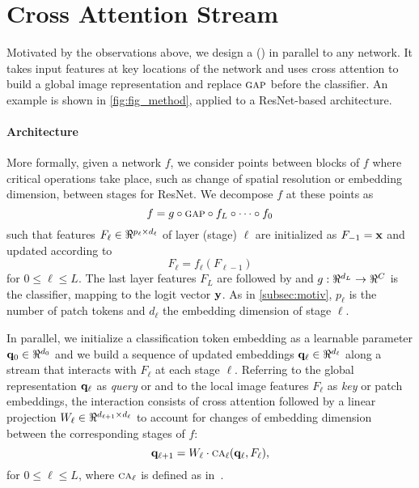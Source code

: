 \section{Cross Attention Stream}
\label{sec:ca_design}
Motivated by the observations above, we design a \emph{\OURS} (\emph{\Ours}) in parallel to any network. It takes input features at key locations of the network and uses cross attention to build a global image representation and replace ${\textsc{gap}}$ before the classifier. An example is shown in \autoref{fig:fig_method}, applied to a ResNet-based architecture.

\paragraph{Architecture}

More formally, given a network $f$, we consider points between blocks of $f$ where critical operations take place, such as change of spatial resolution or embedding dimension, \eg between stages for ResNet. We decompose $f$ at these points as
\begin{equation}
	f = g \circ {\textsc{gap}} \circ f_L \circ \dots \circ f_0
\label{eq:f-decomp}
\end{equation}
such that features $F_\ell \in \real^{p_\ell \times d_\ell}$ of layer (stage) $\ell$ are initialized as $F_{-1} = \mathbf{x}$ and updated according to
\begin{equation}
	F_\ell = f_\ell(F_{\ell-1})
\label{eq:f-layer}
\end{equation}
for $0 \le \ell \le L$. The last layer features $F_L$ are followed by \gap and $g: \real^{d_L} \to \real^C$ is the classifier, mapping to the logit vector $\mathbf{y}$. As in \autoref{subsec:motiv}, $p_\ell$ is the number of patch tokens and $d_\ell$ the embedding dimension of stage $\ell$.

In parallel, we initialize a classification token embedding as a learnable parameter $\vq_0 \in \real^{d_0}$ and we build a sequence of updated embeddings $\vq_\ell \in \real^{d_\ell}$ along a stream that interacts with $F_\ell$ at each stage $\ell$. Referring to the global representation $\mathbf{q}_\ell$ as \emph{query} or \cls and to the local image features $F_\ell$ as \emph{key} or patch embeddings, the interaction consists of cross attention followed by a linear projection $W_\ell \in \real^{d_{\ell+1} \times d_\ell}$ to account for changes of embedding dimension between the corresponding stages of $f$:
\begin{equation}
	\mathbf{q}_{\ell+1} = W_\ell \cdot {\textsc{ca}}_\ell(\mathbf{q}_\ell, F_\ell),
\label{eq:qk-layer}
\end{equation}
for $0 \le \ell \le L$, where ${\textsc{ca}}_\ell$ is defined as in~. 

